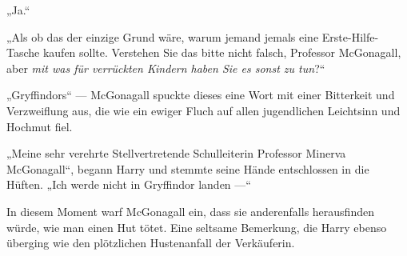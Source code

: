 „Ja.“

„Als ob das der einzige Grund wäre, warum jemand jemals eine Erste-Hilfe-Tasche kaufen sollte. Verstehen Sie das bitte nicht falsch, Professor McGonagall, aber \emph{mit was für verrückten Kindern haben Sie es sonst zu tun}?“

„Gryffindors“ — McGonagall spuckte dieses eine Wort mit einer Bitterkeit und Verzweiflung aus, die wie ein ewiger Fluch auf allen jugendlichen Leichtsinn und Hochmut fiel.

„Meine sehr verehrte Stellvertretende Schulleiterin Professor Minerva McGonagall“, begann Harry und stemmte seine Hände entschlossen in die Hüften.
„Ich werde nicht in Gryffindor landen —“

In diesem Moment warf McGonagall ein, dass sie anderenfalls herausfinden würde, wie man einen Hut tötet. Eine seltsame Bemerkung, die Harry ebenso überging wie den plötzlichen Hustenanfall der Verkäuferin.

